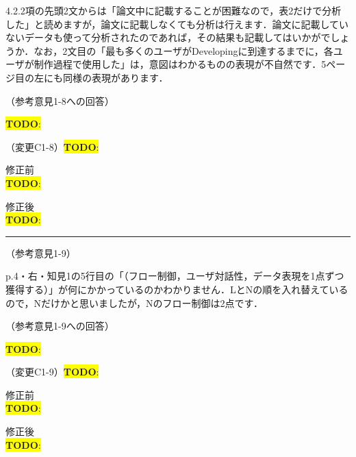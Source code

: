 \documentclass{jarticle} %
\newcommand{\todo}[1]{\colorbox{yellow}{{\bf TODO}:}{\color{blue}{\textbf{[#1]}}}}
\def\subsection#1{ \vspace{1pc} {\gt #1} }
\def\nextans{ \vspace{2pc} \hrule }
\begin{document}
4.2.2項の先頭2文からは「論文中に記載することが困難なので，表2だけで分析した」と読めますが，論文に記載しなくても分析は行えます．論文に記載していないデータも使って分析されたのであれば，その結果も記載してはいかがでしょうか．なお，2文目の「最も多くのユーザがDevelopingに到達するまでに，各ユーザが制作過程で使用した」は，意図はわかるものの表現が不自然です．5ページ目の左にも同様の表現があります．

\subsection{（参考意見1-8への回答）}

\todo{hoge}

\subsection{（変更C1-8）\todo{hoge}}
\vspace{-0.3cm}
\begin{description}
\item 修正前\\
\phantom{　}
\todo{hoge}
\vspace{-0.3cm}
\item 修正後\\
\phantom{　}
\todo{hoge}
\end{description}

\newpage
\nextans
\subsection{（参考意見1-9）}

p.4・右・知見1の5行目の「（フロー制御，ユーザ対話性，データ表現を1点ずつ獲得する）」が何にかかっているのかわかりません．LとNの順を入れ替えているので，Nだけかと思いましたが，Nのフロー制御は2点です．

\subsection{（参考意見1-9への回答）}

\todo{hoge}

\subsection{（変更C1-9）\todo{hoge}}
\vspace{-0.3cm}
\begin{description}
\item 修正前\\
\phantom{　}
\todo{hoge}
\vspace{-0.3cm}
\item 修正後\\
\phantom{　}
\todo{hoge}
\end{description}
\end{document}
